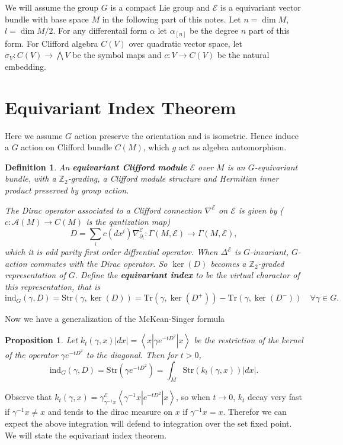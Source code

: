 \documentclass[12pt]{amsart}
\newtheorem{Prop}[Thm]{Proposition}
\newtheorem{Def}[Thm]{Definition}
\def\cA{{\mathcal{A}}}
\def\cE{{\mathcal{E}}}
\def\bZ{{\mathbb{Z}}}
\def\bZ{{\mathbb{Z}}}
\def\Str{{\mathrm{Str}}}
\def\kw#1{{\bf \em #1}}
\def\brk#1{\left<{#1}\right>}
\def\ind{\mathrm{ind}}
\def\Tr{\mathrm{Tr}}
\begin{document}
We will assume the group $G$ is a compact Lie group and $\cE$ is a
equivariant vector bundle with base space $M$ in the following part
of this notes. Let $n=\dim M$, $l = \dim M/2$.
For any differentail form $\alpha$ let $\alpha_{[n]}$ be the degree
$n$ part of this form. For Clifford algebra $C(V)$ over quadratic vector space,
let $\sigma_V\colon C(V) \to \bigwedge V$ be the symbol maps and 
$c \colon V \to C(V)$ be the natural embedding.

\section{Equivariant Index Theorem}
\label{Sec:fix}
Here we assume $G$ action preserve the orientation and is isometric.
Hence induce a $G$ action on Clifford bundle $C(M)$, which $g$ act as algebra
automorphism. 

\begin{Def}
An \kw{equivariant Clifford module} $\cE$ over $M$ 
is an $G$-equivariant bundle, with a $\bZ_2$-grading, 
a Clifford module structure 
and Hermitian inner product preserved by group action.

The Dirac operator associated to a Clifford connection $\nabla^\cE$ on $\cE$
is given by ($c\colon \cA(M) \to C(M)$ is the qantization map)
\[
D = \sum_i c(dx^i)\nabla^\cE_{\partial_i}\colon \Gamma(M,\cE) \to \Gamma(M,\cE),
\]
which it is odd parity first order diffrential operator.
When $\Delta^\cE$ is $G$-invariant, $G$-action commutes with the Dirac operator.
So $\ker(D)$ becomes a $\bZ_2$-graded representation of $G$.
Define the \kw{equivariant index} to be the virtual charactor of this representation, that is 
\[
\ind_G(\gamma, D) = \Str(\gamma, \ker(D)) 
= \Tr(\gamma,\ker(D^+)) - \Tr(\gamma,\ker(D^-))\quad \forall \gamma\in G.
\]
\end{Def}

Now we have a generalization of the McKean-Singer formula
\begin{Prop}
Let $k_t(\gamma, x)|dx|=\brk{x|\gamma e^{-tD^2}|x}$ be the restriction of the
kernel of the operator $\gamma e^{-tD^2}$ to the 
diagonal. Then for $t>0$, 
\[
\ind_G(\gamma,D) = \Str(\gamma e^{-tD^2}) = \int_M \Str(k_t(\gamma,x))|dx|.
\]
\end{Prop}

Observe that $k_t(\gamma,x) = \gamma^\cE_{\gamma^{-1}x}\brk{\gamma^{-1}x|e^{-tD^2}|x}$,
so when $t\to 0$, $k_t$ decay very fast if $\gamma^{-1}x \neq x$ and 
tends to the dirac measure on $x$ if $\gamma^{-1}x=x$.
Therefor we can expect the above integration will defend to integration
over the set fixed point. We will state the equivariant index theorem.
\end{document}
